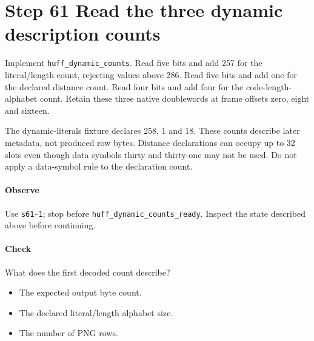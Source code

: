 \section{Step 61 Read the three dynamic description counts}\label{png-huff-s61}
Implement \texttt{huff\_dynamic\_counts}. Read five bits and add 257 for the literal/length count, rejecting values above 286. Read five bits and add one for the declared distance count. Read four bits and add four for the code-length-alphabet count. Retain these three native doublewords at frame offsets zero, eight and sixteen.

The dynamic-literals fixture declares 258, 1 and 18. These counts describe later metadata, not produced row bytes. Distance declarations can occupy up to 32 slots even though data symbols thirty and thirty-one may not be used. Do not apply a data-symbol rule to the declaration count.

\paragraph{Observe} Use \texttt{s61-1}; stop before \texttt{huff\_dynamic\_counts\_ready}. Inspect the state described above before continuing.

\paragraph{Check} What does the first decoded count describe?
\begin{itemize}
  \item[A.] The expected output byte count.
  \item[B.] The declared literal/length alphabet size.
  \item[C.] The number of PNG rows.
\end{itemize}
